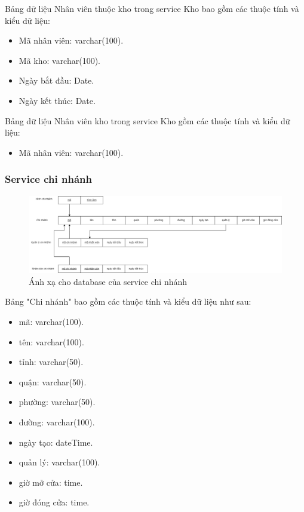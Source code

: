 Bảng dữ liệu Nhân viên thuộc kho trong service Kho bao gồm các thuộc tính và kiểu dữ liệu:
\begin{itemize}
	\item Mã nhân viên: varchar(100).
	\item Mã kho: varchar(100).
	\item Ngày bắt đầu: Date.
	\item Ngày kết thúc: Date.
\end{itemize}

Bảng dữ liệu Nhân viên kho trong service Kho gồm các thuộc tính và kiểu dữ liệu:
\begin{itemize}
	\item Mã nhân viên: varchar(100).
\end{itemize}
\newpage


\subsubsection{Service chi nhánh}
\begin{figure}[!htp]
	\begin{center}
		\includegraphics[width=1\textwidth]{img/database/mapping/branch.png}
		\newline
		\caption{Ánh xạ cho database của service chi nhánh}
	\end{center}
\end{figure}

Bảng "Chi nhánh" bao gồm các thuộc tính và kiểu dữ liệu như sau:
\begin{itemize}
	\item mã: varchar(100).
	\item tên: varchar(100).
	\item tỉnh: varchar(50).
	\item quận: varchar(50).
	\item phường: varchar(50).
	\item đường: varchar(100).
	\item ngày tạo: dateTime.
	\item quản lý: varchar(100).
	\item giờ mở cửa: time.
	\item giờ đóng cửa: time.
\end{itemize}

